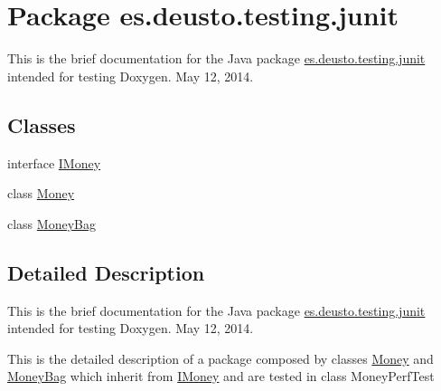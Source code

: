 \hypertarget{namespacees_1_1deusto_1_1testing_1_1junit}{}\section{Package es.\+deusto.\+testing.\+junit}
\label{namespacees_1_1deusto_1_1testing_1_1junit}


This is the brief documentation for the Java package \hyperlink{namespacees_1_1deusto_1_1testing_1_1junit}{es.\+deusto.\+testing.\+junit} intended for testing Doxygen. May 12, 2014.  


\subsection*{Classes}
\begin{DoxyCompactItemize}
\item 
interface \hyperlink{interfacees_1_1deusto_1_1testing_1_1junit_1_1_i_money}{I\+Money}
\item 
class \hyperlink{classes_1_1deusto_1_1testing_1_1junit_1_1_money}{Money}
\item 
class \hyperlink{classes_1_1deusto_1_1testing_1_1junit_1_1_money_bag}{Money\+Bag}
\end{DoxyCompactItemize}


\subsection{Detailed Description}
This is the brief documentation for the Java package \hyperlink{namespacees_1_1deusto_1_1testing_1_1junit}{es.\+deusto.\+testing.\+junit} intended for testing Doxygen. May 12, 2014. 

This is the detailed description of a package composed by classes \hyperlink{classes_1_1deusto_1_1testing_1_1junit_1_1_money}{Money} and \hyperlink{classes_1_1deusto_1_1testing_1_1junit_1_1_money_bag}{Money\+Bag} which inherit from \hyperlink{interfacees_1_1deusto_1_1testing_1_1junit_1_1_i_money}{I\+Money} and are tested in class Money\+Perf\+Test 